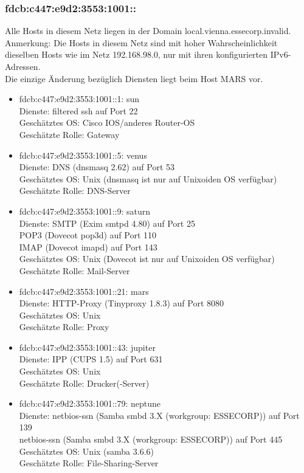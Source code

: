 \documentclass[12pt,a4paper,titlepage,oneside]{scrartcl}
\begin{document}
\subsubsection{fdcb:c447:e9d2:3553:1001::}
Alle Hosts in diesem Netz liegen in der Domain local.vienna.essecorp.invalid.
Anmerkung: Die Hosts in diesem Netz sind mit hoher Wahrscheinlichkeit dieselben Hosts wie im Netz 192.168.98.0, nur mit ihren konfigurierten IPv6-Adressen.\\
Die einzige Änderung bezüglich Diensten liegt beim Host MARS vor.
\begin{itemize}
	\item fdcb:c447:e9d2:3553:1001::1: sun
	\\Dienste: filtered ssh auf Port 22
	\\Geschätztes OS: Cisco IOS/anderes Router-OS
	\\Geschätzte Rolle: Gateway
	
	\item fdcb:c447:e9d2:3553:1001::5: venus
	\\Dienste: DNS (dnsmasq 2.62) auf Port 53
	\\Geschätztes OS: Unix (dnsmasq ist nur auf Unixoiden OS verfügbar)
	\\Geschätzte Rolle: DNS-Server
	
	\item fdcb:c447:e9d2:3553:1001::9: saturn
	\\Dienste: SMTP (Exim smtpd 4.80) auf Port 25
	\\POP3 (Dovecot pop3d) auf Port 110
	\\IMAP (Dovecot imapd) auf Port 143
	\\Geschätztes OS: Unix (Dovecot ist nur auf Unixoiden OS verfügbar)
	\\Geschätzte Rolle: Mail-Server
	
	\item fdcb:c447:e9d2:3553:1001::21: mars
	\\Dienste: HTTP-Proxy (Tinyproxy 1.8.3) auf Port 8080
	\\Geschätztes OS: Unix
	\\Geschätzte Rolle: Proxy
	
	\item fdcb:c447:e9d2:3553:1001::43: jupiter
	\\Dienste: IPP (CUPS 1.5) auf Port 631
	\\Geschätztes OS: Unix
	\\Geschätzte Rolle: Drucker(-Server)

	\item fdcb:c447:e9d2:3553:1001::79: neptune
	\\Dienste: netbios-ssn (Samba smbd 3.X (workgroup: ESSECORP)) auf Port 139
	\\netbios-ssn (Samba smbd 3.X (workgroup: ESSECORP)) auf Port 445
	\\Geschätztes OS: Unix (samba 3.6.6)
	\\Geschätzte Rolle: File-Sharing-Server
	

\end{itemize}
\end{document}

